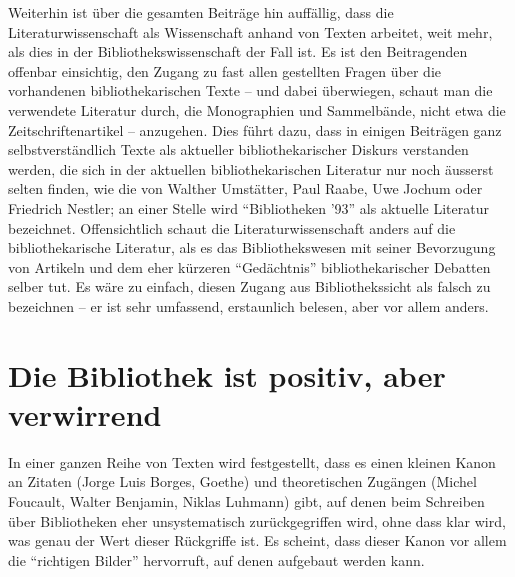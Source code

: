 \documentclass[a4paper,
fontsize=11pt,
oneside,
numbers=noperiodatend,
parskip=half-,
bibliography=totoc,
final
]{scrartcl}
\begin{document}
Weiterhin ist über die gesamten Beiträge hin auffällig, dass die
Literaturwissenschaft als Wissenschaft anhand von Texten arbeitet, weit
mehr, als dies in der Bibliothekswissenschaft der Fall ist. Es ist den
Beitragenden offenbar einsichtig, den Zugang zu fast allen gestellten
Fragen über die vorhandenen bibliothekarischen Texte -- und dabei
überwiegen, schaut man die verwendete Literatur durch, die Monographien
und Sammelbände, nicht etwa die Zeitschriftenartikel -- anzugehen. Dies
führt dazu, dass in einigen Beiträgen ganz selbstverständlich Texte als
aktueller bibliothekarischer Diskurs verstanden werden, die sich in der
aktuellen bibliothekarischen Literatur nur noch äusserst selten finden,
wie die von Walther Umstätter, Paul Raabe, Uwe Jochum oder Friedrich
Nestler; an einer Stelle wird \enquote{Bibliotheken '93} als aktuelle
Literatur bezeichnet. Offensichtlich schaut die Literaturwissenschaft
anders auf die bibliothekarische Literatur, als es das Bibliothekswesen
mit seiner Bevorzugung von Artikeln und dem eher kürzeren
\enquote{Gedächtnis} bibliothekarischer Debatten selber tut. Es wäre zu
einfach, diesen Zugang aus Bibliothekssicht als falsch zu bezeichnen --
er ist sehr umfassend, erstaunlich belesen, aber vor allem anders.

\section*{Die Bibliothek ist positiv, aber
verwirrend}\label{die-bibliothek-ist-positiv-aber-verwirrend}

In einer ganzen Reihe von Texten wird festgestellt, dass es einen
kleinen Kanon an Zitaten (Jorge Luis Borges, Goethe) und theoretischen
Zugängen (Michel Foucault, Walter Benjamin, Niklas Luhmann) gibt, auf
denen beim Schreiben über Bibliotheken eher unsystematisch
zurückgegriffen wird, ohne dass klar wird, was genau der Wert dieser
Rückgriffe ist. Es scheint, dass dieser Kanon vor allem die
\enquote{richtigen Bilder} hervorruft, auf denen aufgebaut werden kann.
\end{document}
